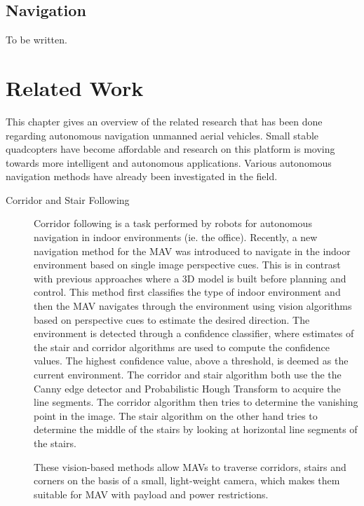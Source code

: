 \documentclass[a4paper]{article}
\begin{document}
\subsection{Navigation}
To be written.
\newpage
\section{Related Work}
This chapter gives an overview of the related research that has been done regarding autonomous navigation unmanned aerial vehicles. Small stable quadcopters have become affordable and research on this platform is moving towards more intelligent and autonomous applications. Various autonomous navigation methods have already been investigated in the field.

\begin{description}
\item[Corridor and Stair Following] Corridor following is a task performed by robots for autonomous navigation in indoor environments (ie. the office). Recently, a new navigation method for the MAV \cite{Bills2011} was introduced to navigate in the indoor environment based on single image perspective cues. This is in contrast with previous approaches where a 3D model is built before planning and control. This method first classifies the type of indoor environment and then the MAV navigates through the environment using vision algorithms based on perspective cues to estimate the desired direction. The environment is detected through a confidence classifier, where estimates of the stair and corridor algorithms are used to compute the confidence values. The highest confidence value, above a threshold, is deemed as the current environment. The corridor and stair algorithm both use the the Canny edge detector and Probabilistic Hough Transform to acquire the line segments. The corridor algorithm then tries to determine the vanishing point in the image. The stair algorithm on the other hand tries to determine the middle of the stairs by looking at horizontal line segments of the stairs.

These vision-based methods allow MAVs to traverse corridors, stairs and corners on the basis of a small, light-weight camera, which makes them suitable for MAV with payload and power restrictions.


\end{description}
\end{document}
